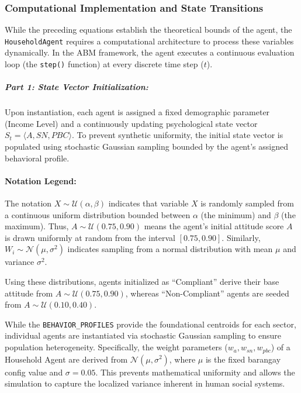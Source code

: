 \subsubsection{Computational Implementation and State Transitions}

While the preceding equations establish the theoretical bounds of the agent, the \texttt{HouseholdAgent} requires a computational architecture to process these variables dynamically. In the ABM framework, the agent executes a continuous evaluation loop (the \texttt{step()} function) at every discrete time step ($t$). 

\subparagraph{Part 1: State Vector Initialization:} 
Upon instantiation, each agent is assigned a fixed demographic parameter (Income Level) and a continuously updating psychological state vector $S_{t} = \langle A, SN, PBC \rangle$. To prevent synthetic uniformity, the initial state vector is populated using stochastic Gaussian sampling bounded by the agent's assigned behavioral profile. 

\paragraph{Notation Legend:}
The notation \(X \sim \mathcal{U}(\alpha, \beta)\) indicates that variable \(X\) is randomly sampled from a continuous uniform distribution bounded between \(\alpha\) (the minimum) and \(\beta\) (the maximum). Thus, \(A \sim \mathcal{U}(0.75, 0.90)\) means the agent's initial attitude score \(A\) is drawn uniformly at random from the interval \([0.75, 0.90]\). Similarly, \(W_i \sim \mathcal{N}(\mu, \sigma^2)\) indicates sampling from a normal distribution with mean \(\mu\) and variance \(\sigma^2\). 

Using these distributions, agents initialized as ``Compliant'' derive their base attitude from \(A \sim \mathcal{U}(0.75, 0.90)\), whereas ``Non-Compliant'' agents are seeded from \(A \sim \mathcal{U}(0.10, 0.40)\).

While the \texttt{BEHAVIOR\_PROFILES} provide the foundational centroids for each sector, individual agents are instantiated via stochastic Gaussian sampling to ensure population heterogeneity. Specifically, the weight parameters ($w_a, w_{sn}, w_{pbc}$) of a Household Agent are derived from $\mathcal{N}(\mu, \sigma^2)$, where $\mu$ is the fixed barangay config value and $\sigma = 0.05$. This prevents mathematical uniformity and allows the simulation to capture the localized variance inherent in human social systems.

